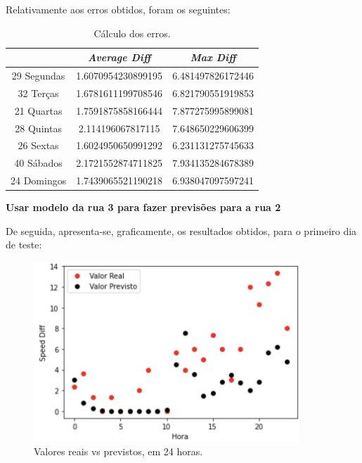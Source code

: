 \documentclass[a4paper, 12pt]{article}
\begin{document}
Relativamente aos erros obtidos, foram os seguintes:

\begin{table}[H]
	\centering
	\begin{tabular}{||c||c|c||}
		\hline\hline
		& \textit{Average Diff} & \textit{Max Diff} \\
		\hline\hline
		29 Segundas & 
1.6070954230899195
 & 6.481497826172446\\
		\hline
		32 Terças  &

1.6781611199708546 & 6.821790551919853 \\
		\hline
		21 Quartas & 1.7591875858166444

 & 7.877275995899081 \\
		\hline
		28 Quintas  & 

2.114196067817115 & 7.648650229606399 \\
		\hline
		26 Sextas & 1.6024950650991292
 & 6.231131275745633 \\
		\hline
		40 Sábados  & 2.1721552874711825
& 7.934135284678389 \\
		\hline
		24 Domingos & 
1.7439065521190218
 & 
6.938047097597241 \\
		\hline\hline
	\end{tabular}
	\label{table:mod3_rua1}
	\caption{Cálculo dos erros.}
\end{table}

\vspace{0.5cm}
\textbf{Usar modelo da rua 3 para fazer previsões para a rua 2}

De seguida, apresenta-se, graficamente, os resultados obtidos, para o primeiro dia de teste:

\begin{figure}[H]
	\centering
	\includegraphics[width=10cm]{resultados/real_prev_mod3_rua2.png}
	\caption{Valores reais vs previstos, em 24 horas.}
\end{figure}
\end{document}
